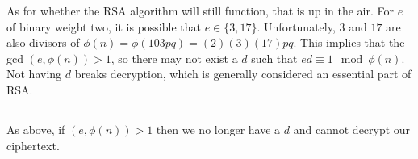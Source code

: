 \documentclass[]{article}
\begin{document}
As for whether the RSA algorithm will still function, that is up in the air.  For $e$ of binary weight two, it is possible that $e \in \{3, 17\}$.  Unfortunately, $3$ and $17$ are also divisors of $\phi(n) = \phi(103pq) = (2)(3)(17)pq$.  This implies that the gcd $(e, \phi(n)) > 1$, so there may not exist a $d$ such that $ed \equiv 1 \mod \phi(n)$.  Not having $d$ breaks decryption, which is generally considered an essential part of RSA.
\subsection{}
As above, if $(e, \phi(n)) > 1$ then we no longer have a $d$ and cannot decrypt our ciphertext.








\end{document}
